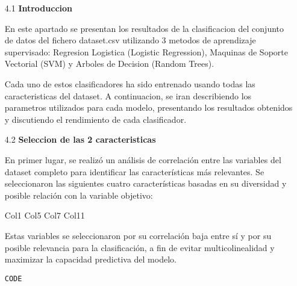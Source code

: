 \documentclass{article}
\begin{document}
\begin{itemize}

\item[4.1]  {\bf Introduccion}

En este apartado se presentan los resultados de la clasificacion del conjunto de datos del fichero dataset.csv utilizando 3 metodos de aprendizaje supervisado: Regresion Logistica (Logistic Regression), Maquinas de Soporte Vectorial (SVM) y Arboles de Decision (Random Trees).

Cada uno de estos clasificadores ha sido entrenado usando todas las caracteristicas del dataset. A continuacion, se iran describiendo los parametros utilizados para cada modelo, presentando los resultados obtenidos y discutiendo el rendimiento de cada clasificador.

\end{itemize}

\bigskip

\begin{itemize}

\item[4.2]  {\bf Seleccion de las 2 caracteristicas}

En primer lugar, se realizó un análisis de correlación entre las variables del dataset completo para identificar las características más relevantes. Se seleccionaron las siguientes cuatro características basadas en su diversidad y posible relación con la variable objetivo:

Col1
Col5
Col7
Col11

Estas variables se seleccionaron por su correlación baja entre sí y por su posible relevancia para la clasificación, a fin de evitar multicolinealidad y maximizar la capacidad predictiva del modelo.

\begin{tcolorbox}[width=14cm]
\begin{scriptsize}
\begin{verbatim}
CODE
\end{verbatim}
\end{scriptsize}
\end{tcolorbox}

\end{itemize}

\bigskip
\end{document}
